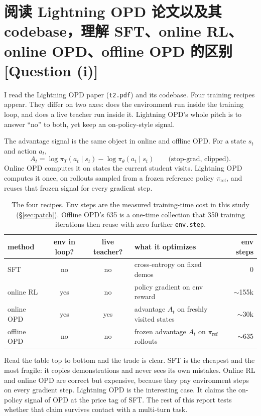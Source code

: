 \documentclass[11pt]{article}
\newcommand{\code}[1]{\texttt{#1}}
\newcommand{\qtag}[1]{\hfill{\normalfont\small\color{gray}[Question (#1)]}}
\begin{document}
\section{阅读 Lightning OPD 论文以及其 codebase，理解 SFT、online RL、online OPD、offline OPD 的区别 \qtag{i}}
\label{sec:methods}

I read the Lightning OPD paper (\code{t2.pdf}) and its codebase. Four training
recipes appear. They differ on two axes: does the environment run inside the
training loop, and does a live teacher run inside it. Lightning OPD's whole pitch
is to answer ``no'' to both, yet keep an on-policy-style signal.

The advantage signal is the same object in online and offline OPD. For a state
$s_t$ and action $a_t$,
\[
A_t = \log \pi_T(a_t \mid s_t) - \log \pi_\theta(a_t \mid s_t)
\qquad \text{(stop-grad, clipped).}
\]
Online OPD computes it on states the current student visits. Lightning
OPD computes it once, on rollouts sampled from a frozen reference policy
$\pi_{\mathrm{ref}}$, and reuses that frozen signal for every gradient step.

\begin{table}[h]
\centering
\small
\begin{tabular}{l c c l r}
\toprule
\textbf{method} & \textbf{env in loop?} & \textbf{live teacher?} & \textbf{what it optimizes} & \textbf{env steps} \\
\midrule
SFT          & no  & no  & cross-entropy on fixed demos                         & 0 \\
online RL    & yes & no  & policy gradient on env reward                        & $\sim$155k \\
online OPD   & yes & yes & advantage $A_t$ on freshly visited states            & $\sim$30k \\
offline OPD  & no  & no  & frozen advantage $A_t$ on $\pi_{\mathrm{ref}}$ rollouts & $\sim$635 \\
\bottomrule
\end{tabular}
\caption{The four recipes. Env steps are the measured training-time cost in this
study (\S\ref{sec:patch}). Offline OPD's 635 is a one-time collection that
350 training iterations then reuse with zero further \code{env.step}.}
\label{tab:methods}
\end{table}

Read the table top to bottom and the trade is clear. SFT is the cheapest and the
most fragile: it copies demonstrations and never sees its own mistakes. Online RL
and online OPD are correct but expensive, because they pay environment steps on
every gradient step. Lightning OPD is the interesting case. It claims the
on-policy signal of OPD at the price tag of SFT. The rest of this report tests
whether that claim survives contact with a multi-turn task.
\end{document}
